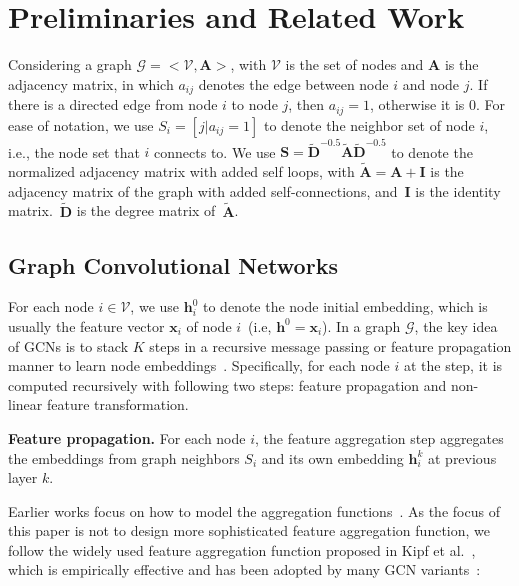 \documentclass[letterpaper]{article} %
\newcommand{\Mat}[1]{\mathbf{#1}}
\begin{document}
\section{Preliminaries and Related Work}
Considering a graph $\mathcal{G}\!=\!<\!\mathcal{V}, \!\mathbf{A}>$, with $\mathcal{V}$ is the set of nodes and $\mathbf{A}$ is the adjacency matrix, in which $a_{ij}$ denotes the edge between node $i$ and node $j$. If there is a directed edge from node $i$ to node $j$, then $a_{ij}\!=\!1$, otherwise it is 0. For ease of notation, we use $S_i\!=\![j| a_{ij}\!=\!1]$ to denote the neighbor set of node $i$, i.e., the node set that $i$ connects to. We use $\Mat{S}\!=\!\Mat{\tilde{D}}^{-0.5}\Mat{\tilde{A}}\Mat{\tilde{D}}^{-0.5}$ to denote the normalized adjacency matrix with added self loops, with $\Mat{\tilde{A}}=\Mat{A}+\Mat{I}$ is the adjacency matrix of the graph with added self-connections, and~$\mathbf{I}$ is the identity matrix.~$\Mat{\tilde{D}}$ is the degree matrix of~$\Mat{\tilde{A}}$.


\subsection{Graph Convolutional Networks}
For each node $i\!\in\!\mathcal{V}$, we use $\mathbf{h}^0_i$ to denote the node initial embedding, which is usually the feature vector $\mathbf{x}_i$ of node $i$~(i.e, $\mathbf{h}^0=\mathbf{x}_i$).  In a graph $\mathcal{G}$, the key idea of GCNs is to stack $K$ steps in a recursive message passing or feature propagation manner to learn node embeddings~\cite{kdd2018GCMC,NIPS2017inductive,ICML2017neural}. Specifically, for each node $i$ at the step, it is computed recursively with following two steps: feature propagation and non-linear feature transformation.





\textbf{Feature propagation.}
For each node $i$, the feature aggregation step aggregates the embeddings from graph neighbors $S_i$ and its own embedding $\mathbf{h}^k_i$ at previous layer $k$.

Earlier works focus on how to model the aggregation functions~\cite{NIPS2017inductive,ICML2017neural,ICLR2018graphATT,ICLR2017semi}. As the focus of this paper is not to design more sophisticated feature aggregation function, we follow the widely used feature aggregation function proposed in Kipf et al.~\cite{ICLR2017semi}, which is empirically effective and has been adopted by many GCN variants~\cite{ICLR2017semi,kdd2018GCMC,ICML2019simplifying}:
\end{document}
